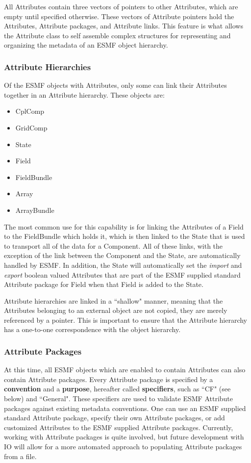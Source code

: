 All Attributes contain three vectors of pointers to other Attributes, which are empty until specified otherwise.  These vectors of Attribute pointers hold the Attributes, Attribute packages, and Attribute links.  This feature is what allows the Attribute class to self assemble complex structures for representing and organizing the metadata of an ESMF object hierarchy.

\subsubsection{Attribute Hierarchies}

Of the ESMF objects with Attributes, only some can link their Attributes together in an Attribute hierarchy.  These objects are:

\begin{itemize}
\item CplComp
\item GridComp
\item State
\item Field
\item FieldBundle
\item Array
\item ArrayBundle
\end{itemize}

The most common use for this capability is for linking the Attributes of a Field to the FieldBundle which holds it, which is then linked to the State that is used to transport all of the data for a Component.  All of these links, with the exception of the link between the Component and the State, are automatically handled by ESMF.  In addition, the State will automatically set the {\it import} and {\it export} boolean valued Attributes that are part of the ESMF supplied standard Attribute package for Field when that Field is added to the State. 

Attribute hierarchies are linked in a ``shallow" manner, meaning that the Attributes belonging to an external object are not copied, they are merely referenced by a pointer.  This is important to ensure that the Attribute hierarchy has a one-to-one correspondence with the object hierarchy.  

\subsubsection{Attribute Packages}
 \label{desc:AttPacks}

At this time, all ESMF objects which are enabled to contain Attributes can also contain Attribute packages.  Every Attribute package is specified by a {\bf convention} and a {\bf purpose}, hereafter called {\bf specifiers}, such as ``CF" (see below) and ``General".  These specifiers are used to validate ESMF Attribute packages against existing metadata conventions.  One can use an ESMF supplied standard Attribute package, specify their own Attribute packages, or add customized Attributes to the ESMF supplied Attribute packages.  Currently, working with Attribute packages is quite involved, but future development with IO will allow for a more automated approach to populating Attribute packages from a file.

